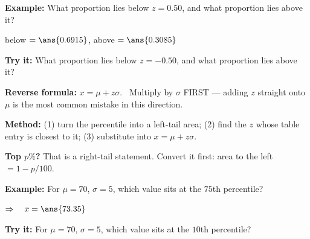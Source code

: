 \documentclass[12pt]{article}
\begin{document}
\begin{examplebox}
\textbf{Example:} \quad What proportion lies below $z = 0.50$, and what proportion lies above it?

below $= \ans{0.6915}$, \quad above $= \ans{0.3085}$
\end{examplebox}

\begin{tryitbox}
\textbf{Try it:} \quad What proportion lies below $z = -0.50$, and what proportion lies above it?\\[2pt]
\end{tryitbox}


\begin{formulabox}
\textbf{Reverse formula:} $x = \mu + z\sigma$. \ Multiply by $\sigma$ FIRST --- adding $z$ straight onto $\mu$ is the most common mistake in this direction.\par
\textbf{Method:} (1) turn the percentile into a left-tail area; (2) find the $z$ whose table entry is closest to it; (3) substitute into $x = \mu + z\sigma$.\par
\textbf{Top $p\%$?} That is a right-tail statement. Convert it first: area to the left $= 1 - p/100$.
\end{formulabox}

\begin{examplebox}
\textbf{Example:} \quad For $\mu = 70$, $\sigma = 5$, which value sits at the $75$th percentile?

$\Rightarrow\quad x = \ans{73.35}$
\end{examplebox}

\begin{tryitbox}
\textbf{Try it:} \quad For $\mu = 70$, $\sigma = 5$, which value sits at the $10$th percentile?\\[2pt]
\end{tryitbox}
\end{document}
